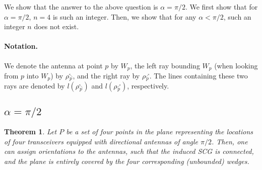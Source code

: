 \documentclass[11pt,letter]{article}
\newtheorem{theorem}{Theorem}[section]
\def\wedge#1{{W_{{#1}}}}
\def\leftray#1{{\rho{\stackrel{_\nwarrow}{_{#1}}}}}
\def\rightray#1{{\rho{\stackrel{_\nearrow}{_{#1}}}}}
\def\leftline#1{{l(\leftray{#1})}}
\def\rightline#1{{l(\rightray{#1})}}
\begin{document}
We show that the answer to the above question is $\alpha = \pi /2$.
We first show that for $\alpha = \pi/2$, $n=4$ is such an integer. Then, we show that for any $\alpha < \pi/2$, such an integer $n$ does not exist.

\paragraph{Notation.}
We denote the antenna at point $p$ by $\wedge{p}$,
the left ray bounding $\wedge{p}$ (when looking from $p$ into $\wedge{p}$) by $\leftray{p}$,
and the right ray by $\rightray{p}$.
The lines containing these two rays are denoted by $\leftline{p}$ and $\rightline{p}$, respectively.

\subsection {$\alpha=\pi/2$}


\begin{theorem} \label{thm:fourpoints}
Let $P$ be a set of four points in the plane representing the locations of four transceivers equipped with directional antennas of angle $\pi/2$.
Then, one can assign orientations to the antennas, such that
the induced SCG is connected,
and the plane is entirely covered by the four corresponding (unbounded) wedges.
\end{theorem}
\end{document}
